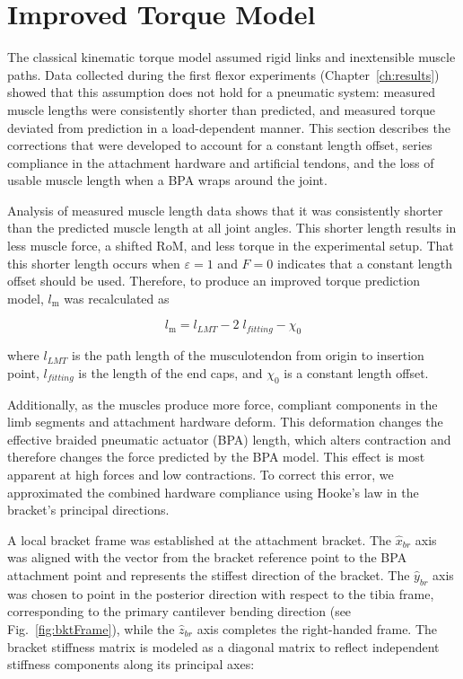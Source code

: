\section{Improved Torque Model}\label{sec:improved_model}

The classical kinematic torque model assumed rigid links and inextensible muscle paths. Data collected during the first flexor experiments (Chapter~\ref{ch:results}) showed that this assumption does not hold for a pneumatic system: measured muscle lengths were consistently shorter than predicted, and measured torque deviated from prediction in a load-dependent manner. This section describes the corrections that were developed to account for a constant length offset, series compliance in the attachment hardware and artificial tendons, and the loss of usable muscle length when a BPA wraps around the joint.

Analysis of measured muscle length data shows that it was consistently shorter than the predicted muscle length at all joint angles. This shorter length results in less muscle force, a shifted RoM, and less torque in the experimental setup. That this shorter length occurs when $\varepsilon=1$ and $F=0$ indicates that a constant length offset should be used. Therefore, to produce an improved torque prediction model, $l_\text{m}$ was recalculated as

\begin{equation}
    l_\text{m} = l_{LMT} - 2\;l_{fitting} - \chi_{0} 
    \label{eq:Lm}
\end{equation}

where $l_{LMT}$ is the path length of the musculotendon from origin to insertion point, $l_{fitting}$ is the length of the end caps, and $\chi_{0}$ is a constant length offset. 

Additionally, as the muscles produce more force, compliant components in the limb segments and attachment hardware deform. This deformation changes the effective braided pneumatic actuator (BPA) length, which alters contraction and therefore changes the force predicted by the BPA model. This effect is most apparent at high forces and low contractions. To correct this error, we approximated the combined hardware compliance using Hooke's law in the bracket's principal directions.

A local bracket frame was established at the attachment bracket. The $\hat{x}_{br}$ axis was aligned with the vector from the bracket reference point to the BPA attachment point and represents the stiffest direction of the bracket. The $\hat{y}_{br}$ axis was chosen to point in the posterior direction with respect to the tibia frame, corresponding to the primary cantilever bending direction (see Fig.~\ref{fig:bktFrame}), while the $\hat{z}_{br}$ axis completes the right-handed frame. The bracket stiffness matrix is modeled as a diagonal matrix to reflect independent stiffness components along its principal axes:

